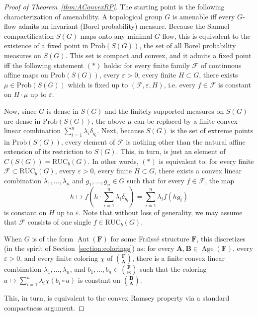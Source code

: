\documentclass[11pt]{article}
\theoremstyle{definition}
\numberwithin{equation}{section}
\numberwithin{figure}{section}
\numberwithin{table}{section}
\newcommand*{\mA}{\mathbf{A}}
\newcommand*{\mB}{\mathbf{B}}
\newcommand*{\mF}{\mathbf{F}}
\newcommand{\e}{\varepsilon}
\DeclareMathOperator{\Aut}{Aut}
\DeclareMathOperator{\Age}{Age}
\newcommand{\RUCB}{\mathrm{RUC}_{b}}
\begin{document}
\begin{proof}[Proof of Theorem~\ref{thm:AConvexRP}]
The starting point is the following characterization of amenability. A topological group $G$ is amenable iff every $G$-flow admits an invariant (Borel probability) measure. Because the Samuel compactification $S(G)$ maps onto any minimal $G$-flow, this is equivalent to the existence of a fixed point in $\mathrm{Prob}(S(G))$, the set of all Borel probability measures on $S(G)$. This set is compact and convex, and it admits a fixed point iff the following statement $(*)$ holds: for every finite family $\mathcal F$ of continuous affine maps on $\mathrm{Prob}(S(G))$, every $\varepsilon >0$, every finite $H\subset G$, there exists $\mu \in \mathrm{Prob}(S(G))$ which is fixed up to $(\mathcal F, \e, H)$, i.e. every $f\in \mathcal F$ is constant on $H\cdot\mu$ up to $\varepsilon$.

Now, since $G$ is dense in $S(G)$ and the finitely supported measures on $S(G)$ are dense in $\mathrm{Prob}(S(G))$, the above $\mu$ can be replaced by a finite convex linear combination $\sum_{i=1}^{n}\lambda_{i}\delta_{g_{i}}$. Next, because $S(G)$ is the set of extreme points in $ \mathrm{Prob}(S(G))$, every element of $\mathcal F$ is nothing other than the natural affine extension of its restriction to $S(G)$. This, in turn, is just an element of $C(S(G))=\RUCB(G)$. In other words, $(*)$ is equivalent to: for every finite $\mathcal F \subset \RUCB(G)$, every $\varepsilon >0$, every finite $H\subset G$, there exists a convex linear combination $\lambda_{1},\ldots, \lambda_{n}$ and $g_{1},\ldots,g_{n}\in G$ such that for every $f\in \mathcal F$, the map
\[
h\mapsto f\!\left(h\cdot \sum_{i=1}^{n}\lambda_{i}\delta_{g_{i}}\right)=\sum_{i=1}^{n}\lambda_{i}f(hg_{i})
\]
is constant on $H$ up to $\e$. Note that without loss of generality, we may assume that $\mathcal F$ consists of one single $f\in \RUCB(G)$.

When $G$ is of the form $\Aut(\mF)$ for some Fra\"{\i}ss\'e structure $\mF$, this discretizes (in the spirit of Section~\ref{section:colorings}) as: for every $\mA, \mB \in \Age(\mF)$, every $\e>0$, and every finite coloring $\chi$ of $\binom{\mF}{\mA}$, there is a finite convex linear combination $\lambda_{1},\ldots,\lambda_{n}$, and $b_{1},\ldots,b_{n}\in \binom{\mF}{\mB}$ such that the coloring $a\mapsto \sum_{i=1}^{n}\lambda_{i}\chi(b_{i}\circ a)$ is constant on $\binom{\mB}{\mA}$.

This, in turn, is equivalent to the convex Ramsey property via a standard compactness argument.
\end{proof}
\end{document}
